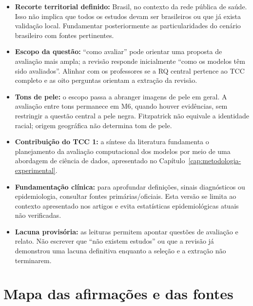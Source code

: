 \begin{itemize}
\tightlist
\item
  \textbf{Recorte territorial definido:} Brasil, no contexto da rede
  pública de saúde. Isso não implica que todos os estudos devam ser
  brasileiros ou que já exista validação local. Fundamentar
  posteriormente as particularidades do cenário brasileiro com fontes
  pertinentes.
\item
  \textbf{Escopo da questão:} ``como avaliar'' pode orientar uma
  proposta de avaliação mais ampla; a revisão responde inicialmente
  ``como os modelos têm sido avaliados''. Alinhar com os professores se
  a RQ central pertence ao TCC completo e as oito perguntas orientam a
  extração da revisão.
\item
  \textbf{Tons de pele:} o escopo passa a abranger imagens de pele em
  geral. A avaliação entre tons permanece em M6, quando houver
  evidências, sem restringir a questão central a pele negra. Fitzpatrick
  não equivale a identidade racial; origem geográfica não determina tom
  de pele.
\item
  \textbf{Contribuição do TCC 1:} a síntese da literatura fundamenta
  o planejamento da avaliação computacional dos modelos por meio de uma
  abordagem de ciência de dados, apresentado no
  Capítulo~\ref{cap:metodologia-experimental}.
\item
  \textbf{Fundamentação clínica:} para aprofundar definições, sinais
  diagnósticos ou epidemiologia, consultar fontes primárias/oficiais.
  Esta versão se limita ao contexto apresentado nos artigos e evita
  estatísticas epidemiológicas atuais não verificadas.
\item
  \textbf{Lacuna provisória:} as leituras permitem apontar questões de
  avaliação e relato. Não escrever que ``não existem estudos'' ou que a
  revisão já demonstrou uma lacuna definitiva enquanto a seleção e a
  extração não terminarem.
\end{itemize}

\section{Mapa das afirmações e das
fontes}\label{mapa-das-afirmauxe7uxf5es-e-das-fontes}

